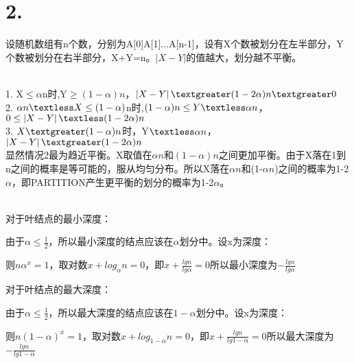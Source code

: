 \documentclass[UTF8]{ctexart}
\begin{document}
	\section*{2.}
	\par{设随机数组有n个数，分别为A[0]A[1]...A[n-1]，设有X个数被划分在左半部分，Y个数被划分在右半部分，X+Y=n。$\left|X-Y\right|$的值越大，划分越不平衡。}
	\par{}\\
	 1. X$\le\alpha$n时,Y$\ge(1-\alpha)n$，$\left|X-Y\right|\textgreater(1-2\alpha)n\textgreater0$\\
	 2. $\alpha n\textless X\le(1-\alpha)$n时,$(1-\alpha)n\le Y\textless\alpha n$，$0\le\left|X-Y\right|\textless(1-2\alpha)n$\\
	 3. $X\textgreater(1-\alpha)n$时，Y$\textless\alpha n$，$\left|X-Y\right|\textgreater(1-2\alpha)n$\\
	 显然情况2最为趋近平衡。X取值在$\alpha n$和$(1-\alpha)n$之间更加平衡。由于X落在1到n之间的概率是等可能的，服从均匀分布。所以X落在$\alpha n$和(1-$\alpha n$)之间的概率为1-2$\alpha$，即PARTITION产生更平衡的划分的概率为1-2$\alpha$。
	\\
	\\
	\par{对于叶结点的最小深度：}
	\par{由于$\alpha\le\frac{1}{2}$，所以最小深度的结点应该在$\alpha$划分中。设x为深度：}
	\par{则$n\alpha^{x}=1$，取对数$x+log_{\alpha}n=0$，即$x+\frac{lgn}{lg\alpha}=0$所以最小深度为$-\frac{lgn}{lg\alpha}$}
	\par{对于叶结点的最大深度：}
	\par{由于$\alpha\le\frac{1}{2}$，所以最大深度的结点应该在$1-\alpha$划分中。设x为深度：}
	\par{则$n(1-\alpha)^{x}=1$，取对数$x+log_{1-\alpha}n=0$，即$x+\frac{lgn}{lg1-\alpha}=0$所以最大深度为$-\frac{lgn}{lg1-\alpha}$}
\end{document}
